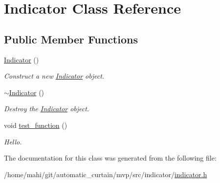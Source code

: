 \hypertarget{classIndicator}{}\section{Indicator Class Reference}
\label{classIndicator}
\subsection*{Public Member Functions}
\begin{DoxyCompactItemize}
\item 
\mbox{\label{classIndicator_add29c7a02300b2e0cf35fb123692a6a6}} 
\hyperlink{classIndicator_add29c7a02300b2e0cf35fb123692a6a6}{Indicator} ()
\begin{DoxyCompactList}\small\item\em Construct a new \hyperlink{classIndicator}{Indicator} object. \end{DoxyCompactList}\item 
\mbox{\label{classIndicator_a8099ca10ae3ae131b0423899f1abb61c}} 
\hyperlink{classIndicator_a8099ca10ae3ae131b0423899f1abb61c}{$\sim$\+Indicator} ()
\begin{DoxyCompactList}\small\item\em Destroy the \hyperlink{classIndicator}{Indicator} object. \end{DoxyCompactList}\item 
\mbox{\label{classIndicator_abb3adf280408b88ad347fae180c10452}} 
void \hyperlink{classIndicator_abb3adf280408b88ad347fae180c10452}{test\+\_\+function} ()
\begin{DoxyCompactList}\small\item\em Hello. \end{DoxyCompactList}\end{DoxyCompactItemize}


The documentation for this class was generated from the following file\+:\begin{DoxyCompactItemize}
\item 
/home/mahi/git/automatic\+\_\+curtain/mvp/src/indicator/\hyperlink{indicator_8h}{indicator.\+h}\end{DoxyCompactItemize}
